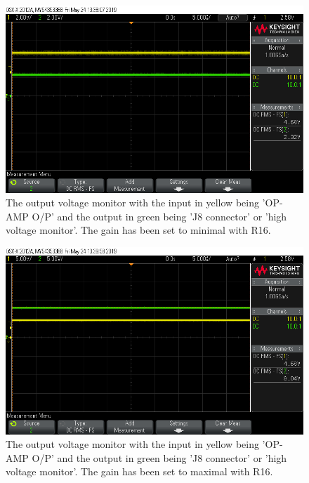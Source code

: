 \begin{figure}[H]
\centering
\includegraphics[width=.9\textwidth]{figures/scope_10.png}
\caption{The output voltage monitor with the input in yellow being 'OP-AMP O/P' and the output in green being 'J8 connector' or 'high voltage monitor'. The gain has been set to minimal with R16.}
\label{fig:scope_10}
\end{figure}


\begin{figure}[H]
\centering
\includegraphics[width=.9\textwidth]{figures/scope_11.png}
\caption{The output voltage monitor with the input in yellow being 'OP-AMP O/P' and the output in green being 'J8 connector' or 'high voltage monitor'. The gain has been set to maximal with R16.}
\label{fig:scope_11}
\end{figure}


